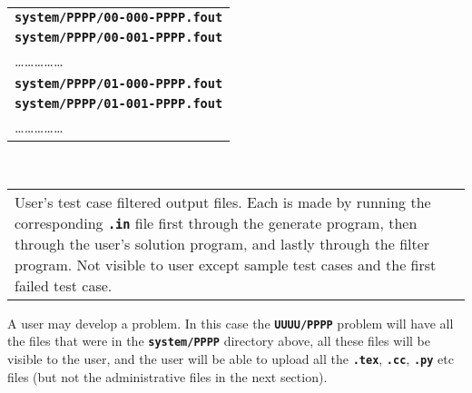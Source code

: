 \documentclass[12pt]{article}
\newcommand{\TT}[1]{{\tt \bfseries #1}}
\newenvironment{indpar}[1][0.4in]%
	{\begin{list}{}%
		     {\setlength{\itemsep}{0in}%
		      \setlength{\topsep}{0in}%
		      \setlength{\parsep}{1ex}%
		      \setlength{\labelwidth}{#1}%
		      \setlength{\leftmargin}{#1}%
		      \addtolength{\leftmargin}{\labelsep}}%
	 \item}%
	{\end{list}}
\newcommand{\ITEM}{\hspace*{-0.2in}}
\begin{document}
\begin{indpar}
\ITEM\begin{tabular}[t]{@{}l}
     \TT{system/PPPP/00-000-PPPP.fout} \\
     \TT{system/PPPP/00-001-PPPP.fout} \\
     \ldots\ldots\ldots\ldots\ldots \\
     \TT{system/PPPP/01-000-PPPP.fout} \\
     \TT{system/PPPP/01-001-PPPP.fout} \\
     \ldots\ldots\ldots\ldots\ldots \\
     \end{tabular}
     ~~~~
     \begin{tabular}[t]{p{3in}}
     User's test case filtered output files.  Each is made by running
     the corresponding \TT{.in} file first through the generate
     program, then through the user's solution program, and lastly
     through the filter program.
     Not visible to user except sample test cases and the first failed
     test case.
     \end{tabular}
\end{indpar}

A user may develop a problem.  In this case the \TT{UUUU/PPPP} problem
will have all the files that were in the \TT{system/PPPP} directory
above, all these files will be visible to the user, and the user
will be able to upload all the \TT{.tex}, \TT{.cc}, \TT{.py} etc
files (but not the administrative files in the next section).
\end{document}
